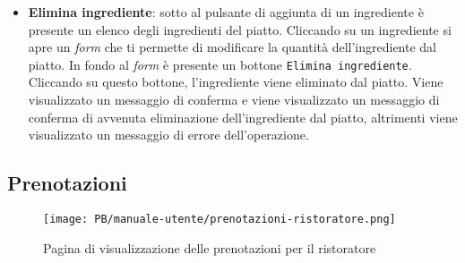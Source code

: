\begin{itemize}
	\item \textbf{Elimina ingrediente}: sotto al pulsante di aggiunta di un
		ingrediente è presente un elenco degli ingredienti del piatto. Cliccando
		su un ingrediente si apre un \textit{form} che ti permette di modificare la
		quantità dell'ingrediente dal piatto. In fondo al \textit{form} è presente un
		bottone \texttt{Elimina ingrediente}. Cliccando su questo bottone,
		l'ingrediente viene eliminato dal piatto. Viene visualizzato un messaggio
		di conferma e viene visualizzato un messaggio di conferma di avvenuta
		eliminazione dell'ingrediente dal piatto, altrimenti viene visualizzato
		un messaggio di errore dell'operazione.
\end{itemize}

\subsection{Prenotazioni}

\begin{figure}[htbp]
    \centering
	\texttt{[image: PB/manuale-utente/prenotazioni-ristoratore.png]}
	\caption{Pagina di visualizzazione delle prenotazioni per il ristoratore}
\end{figure}

